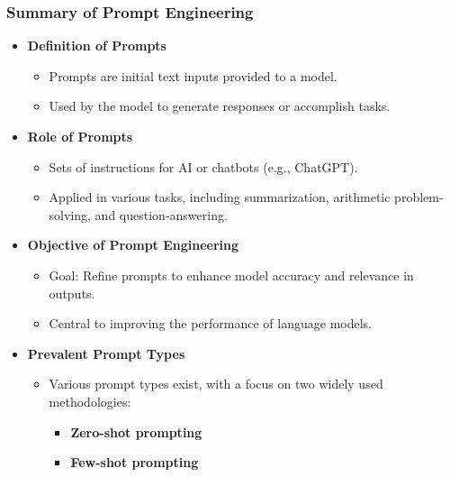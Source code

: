\begin{frame}[fragile]\frametitle{Summary of Prompt Engineering}

\begin{itemize}
  \item \textbf{Definition of Prompts}
    \begin{itemize}
      \item Prompts are initial text inputs provided to a model.
      \item Used by the model to generate responses or accomplish tasks.
    \end{itemize}

  \item \textbf{Role of Prompts}
    \begin{itemize}
      \item Sets of instructions for AI or chatbots (e.g., ChatGPT).
      \item Applied in various tasks, including summarization, arithmetic problem-solving, and question-answering.
    \end{itemize}

  \item \textbf{Objective of Prompt Engineering}
    \begin{itemize}
      \item Goal: Refine prompts to enhance model accuracy and relevance in outputs.
      \item Central to improving the performance of language models.
    \end{itemize}

  \item \textbf{Prevalent Prompt Types}
    \begin{itemize}
      \item Various prompt types exist, with a focus on two widely used methodologies:
        \begin{itemize}
          \item \textbf{Zero-shot prompting}
          \item \textbf{Few-shot prompting}
        \end{itemize}
    \end{itemize}
\end{itemize}

\end{frame}


